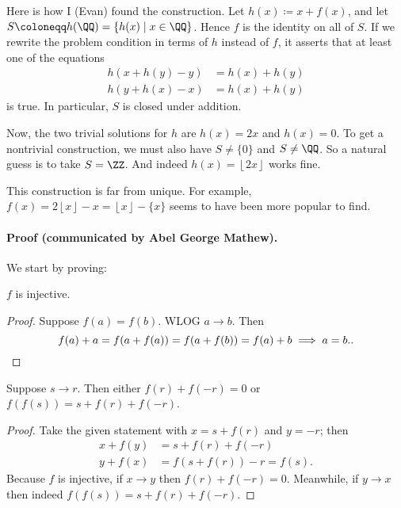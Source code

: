 \documentclass[11pt]{scrartcl}
\begin{document}
\begin{remark*}
  Here is how I (Evan) found the construction.
  Let $h(x) \coloneqq x+f(x)$, and let $S \coloneqq h(\QQ) = \{h(x) \mid x \in \QQ\}$.
  Hence $f$ is the identity on all of $S$.
  If we rewrite the problem condition in terms of $h$ instead of $f$,
  it asserts that at least one of the equations
  \begin{align*}
    h(x+h(y)-y) &= h(x)+h(y) \\
    h(y+h(x)-x) &= h(x)+h(y)
  \end{align*}
  is true.
  In particular, $S$ is closed under addition.

  Now, the two trivial solutions for $h$ are $h(x) = 2x$ and $h(x) = 0$.
  To get a nontrivial construction, we must also have $S \neq \{0\}$ and $S \neq \QQ$.
  So a natural guess is to take $S = \ZZ$.
  And indeed $h(x) = \left\lfloor 2x \right\rfloor$ works fine.
\end{remark*}
\begin{remark*}
  This construction is far from unique. For example,
  $f(x) = 2\left\lfloor x \right\rfloor - x = \left\lfloor x \right\rfloor - \{x\}$
  seems to have been more popular to find.
\end{remark*}

\paragraph{Proof (communicated by Abel George Mathew).}
We start by proving:
\begin{claim*}
  $f$ is injective.
\end{claim*}
\begin{proof}
  Suppose $f(a) = f(b)$. WLOG $a \to b$. Then
  \[ f(a)+a = f(a+f(a)) = f(a+f(b)) = f(a)+b \implies a=b. \qedhere. \]
\end{proof}

\begin{claim*}
  Suppose $s \to r$.
  Then either $f(r) + f(-r) = 0$ or $f(f(s)) = s+f(r)+f(-r)$.
\end{claim*}
\begin{proof}
  Take the given statement with $x = s+f(r)$ and $y = -r$; then
  \begin{align*}
    x + f(y) &= s + f(r) + f(-r) \\
    y + f(x) &= f(s+f(r)) - r = f(s).
  \end{align*}
  Because $f$ is injective, if $x \to y$ then $f(r) + f(-r) = 0$.
  Meanwhile, if $y \to x$ then indeed $f(f(s)) = s + f(r) + f(-r)$.
\end{proof}
\end{document}
